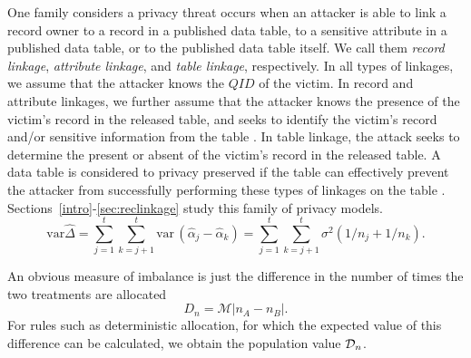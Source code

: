 One family considers a privacy threat occurs when an attacker is able to link a record owner to a record in a published data table, to a sensitive attribute in a published data table, or to the published data table itself. We call them \emph{record linkage}, \emph{attribute linkage}, and \emph{table linkage}, respectively. In all types of linkages, we assume that the attacker knows the $QID$ of the victim. In record and attribute linkages, we further assume that the attacker knows the presence of the victim's record in the released table, and seeks to identify the victim's record and/or sensitive information from the table \cite{yao2002can}. In table linkage, the attack seeks to determine the present or absent of the victim's record in the released table. A data table is considered to privacy preserved if the table can effectively prevent the attacker from successfully performing these types of linkages on the table \cite{madden2002tta}. Sections~\ref{intro}-\ref{sec:reclinkage} study this family of privacy models.
\begin{equation}
\mbox{var}\widehat{\Delta} = \sum_{j = 1}^t \sum_{k = j+1}^t
\mbox{var}\,(\hat{\alpha}_j - \hat{\alpha}_k)  = \sum_{j = 1}^t
\sum_{k = j+1}^t \sigma^2(1/n_j + 1/n_k). \label{2delvart2}
\end{equation}

An obvious measure of imbalance is just the difference in the
number of times the two treatments are allocated
\begin{equation}
D_n = \mathcal{M}|n_A - n_B|. \label{2deffD}
\end{equation}
For rules such as deterministic allocation, for which the expected
value of this difference can be calculated, we obtain the population
value ${\cal D}_n$.


